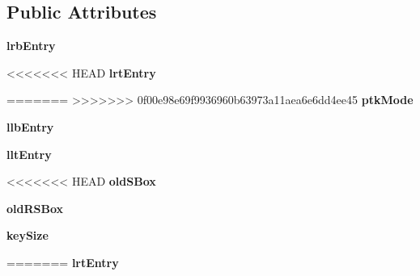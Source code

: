 \subsection*{Public Attributes}
\begin{DoxyCompactItemize}
\item 
\hypertarget{classsimplegui_1_1_main_scene_a3caeb0ed63f79e39b6cb371333588459}{{\bfseries lrb\-Entry}}\label{classsimplegui_1_1_main_scene_a3caeb0ed63f79e39b6cb371333588459}

\item 
<<<<<<< HEAD
\hypertarget{classsimplegui_1_1_main_scene_a397b09a55f332b362aa9ed4a4cc93888}{{\bfseries lrt\-Entry}}\label{classsimplegui_1_1_main_scene_a397b09a55f332b362aa9ed4a4cc93888}

\item 
=======
>>>>>>> 0f00e98e69f9936960b63973a11aea6e6dd4ee45
\hypertarget{classsimplegui_1_1_main_scene_a6f6b3ee72b43ee95448828b8dd1fe675}{{\bfseries ptk\-Mode}}\label{classsimplegui_1_1_main_scene_a6f6b3ee72b43ee95448828b8dd1fe675}

\item 
\hypertarget{classsimplegui_1_1_main_scene_a5dd2dd757387dfd57519b395382b23d2}{{\bfseries llb\-Entry}}\label{classsimplegui_1_1_main_scene_a5dd2dd757387dfd57519b395382b23d2}

\item 
\hypertarget{classsimplegui_1_1_main_scene_af83011177cccee7fd54e54be752e0a58}{{\bfseries llt\-Entry}}\label{classsimplegui_1_1_main_scene_af83011177cccee7fd54e54be752e0a58}

\item 
<<<<<<< HEAD
\hypertarget{classsimplegui_1_1_main_scene_a12caf5854924dac329f3ee95d5c2f67f}{{\bfseries old\-S\-Box}}\label{classsimplegui_1_1_main_scene_a12caf5854924dac329f3ee95d5c2f67f}

\item 
\hypertarget{classsimplegui_1_1_main_scene_ab5c6e082bdf28d47e18c15115fb9d29a}{{\bfseries old\-R\-S\-Box}}\label{classsimplegui_1_1_main_scene_ab5c6e082bdf28d47e18c15115fb9d29a}

\item 
\hypertarget{classsimplegui_1_1_main_scene_a07365b93310d51583324117e96f548c7}{{\bfseries key\-Size}}\label{classsimplegui_1_1_main_scene_a07365b93310d51583324117e96f548c7}
=======
\hypertarget{classsimplegui_1_1_main_scene_a397b09a55f332b362aa9ed4a4cc93888}{{\bfseries lrt\-Entry}}\label{classsimplegui_1_1_main_scene_a397b09a55f332b362aa9ed4a4cc93888}


\end{DoxyCompactItemize}
